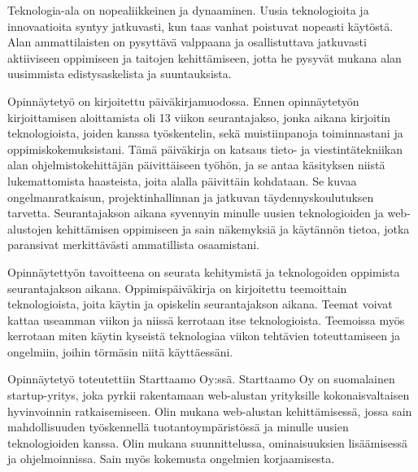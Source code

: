 \documentclass[11pt,a4paper,titlepage,oneside]{article}
\begin{document}

Teknologia-ala on nopealiikkeinen ja dynaaminen. 
Uusia teknologioita ja innovaatioita syntyy jatkuvasti, kun taas vanhat poistuvat nopeasti käytöstä.
Alan ammattilaisten on pysyttävä valppaana ja osallistuttava jatkuvasti aktiiviseen oppimiseen ja taitojen kehittämiseen,
jotta he pysyvät mukana alan uusimmista edistysaskelista ja suuntauksista.
\medskip




Opinnäytetyö on kirjoitettu päiväkirjamuodossa. 
Ennen opinnäytetyön kirjoittamisen aloittamista oli 13 viikon seurantajakso, jonka aikana kirjoitin teknologioista,
joiden kanssa työskentelin, sekä muistiinpanoja toiminnastani ja oppimiskokemuksistani.
Tämä päiväkirja on katsaus tieto- ja viestintätekniikan alan ohjelmistokehittäjän päivittäiseen työhön,
ja se antaa käsityksen niistä lukemattomista haasteista, joita alalla päivittäin kohdataan.
Se kuvaa ongelmanratkaisun, projektinhallinnan ja jatkuvan täydennyskoulutuksen tarvetta.
Seurantajakson aikana syvennyin minulle uusien teknologioiden ja web-alustojen kehittämisen oppimiseen ja sain näkemyksiä ja käytännön tietoa,
jotka paransivat merkittävästi ammatillista osaamistani.
\medskip



% 
Opinnäytettyön tavoitteena on seurata kehitymistä ja teknologoiden oppimista seurantajakson aikana.
% 
Oppimispäiväkirja on kirjoitettu teemoittain teknologioista, joita käytin ja opiskelin seurantajakson aikana.
Teemat voivat kattaa useamman viikon ja niissä kerrotaan itse teknologioista. 
Teemoissa myös kerrotaan miten käytin kyseistä teknologiaa viikon tehtävien toteuttamiseen ja
ongelmiin, joihin törmäsin niitä käyttäessäni.
\medskip






Opinnäytetyö toteutettiin Starttaamo Oy:ssä. Starttaamo Oy on suomalainen startup-yritys,
 joka pyrkii rakentamaan web-alustan yrityksille kokonaisvaltaisen hyvinvoinnin ratkaisemiseen.
%
% 
%
Olin mukana web-alustan kehittämisessä, jossa
%
sain mahdollisuuden työskennellä tuotantoympäristössä ja minulle uusien teknologioiden kanssa.
Olin mukana suunnittelussa, ominaisuuksien lisäämisessä ja ohjelmoinnissa. 
Sain myös kokemusta ongelmien korjaamisesta.
\end{document}
